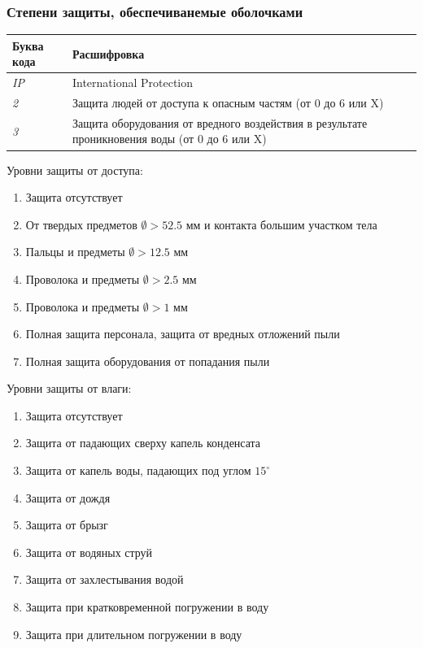 \documentclass[a4paper, 14pt]{extarticle}
\begin{document}
\subsubsection*{Степени защиты, обеспечиванемые оболочками}
\begin{table}[h]
\begin{tabularx}{\textwidth}{@{}lX@{}}
\toprule
Буква кода & Расшифровка \\ \midrule
\textit{IP} & International Protection                                                                      \\
\textit{2}  & Защита людей от доступа к опасным частям (от 0 до 6 или X)                                    \\
\textit{3}  & Защита оборудования от вредного воздействия в результате проникновения воды (от 0 до 6 или X) \\ \bottomrule
\end{tabularx}
\end{table}

Уровни защиты от доступа:
\begin{enumerate}[start=0,label=\arabic* --- ]
    \item Защита отсутствует
    \item От твердых предметов $\emptyset > 52.5$ мм и контакта большим участком тела
    \item Пальцы и предметы $\emptyset > 12.5$ мм
    \item Проволока и предметы $\emptyset > 2.5$ мм
    \item Проволока и предметы $\emptyset > 1$ мм
    \item Полная защита персонала, защита от вредных отложений пыли
    \item Полная защита оборудования от попадания пыли
\end{enumerate}

Уровни защиты от влаги:
\begin{enumerate}[start=0,label=\arabic* --- ]
    \item Защита отсутствует
    \item Защита от падающих сверху капель конденсата
    \item Защита от капель воды, падающих под углом $15^\circ$
    \item Защита от дождя
    \item Защита от брызг
    \item Защита от водяных струй
    \item Защита от захлестывания водой
    \item Защита при кратковременной погружении в воду
    \item Защита при длительном погружении в воду
\end{enumerate}
\end{document}

